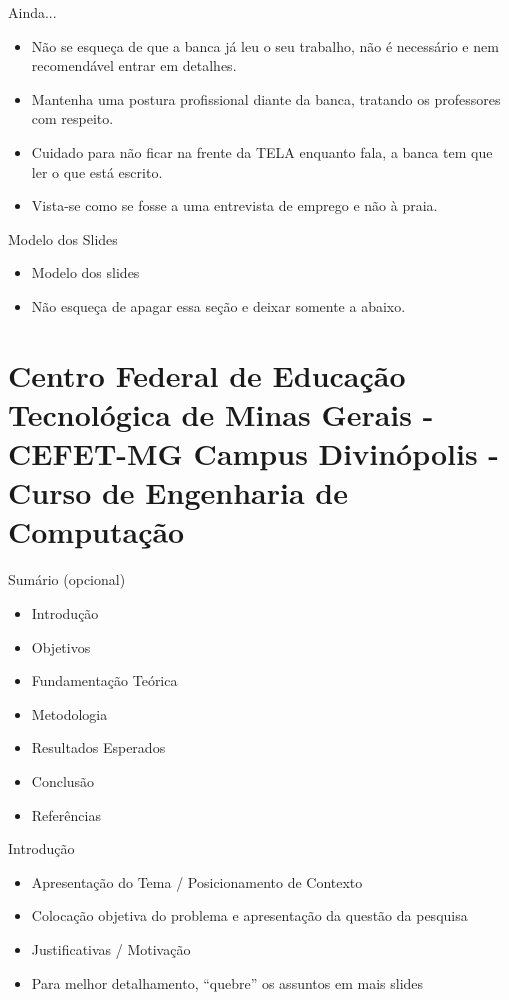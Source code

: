 \documentclass{beamer}
\begin{document}
\begin{frame}{Ainda...}
    \begin{itemize}
        \item Não se esqueça de que a banca já leu o seu trabalho, não é necessário e nem recomendável entrar em detalhes.
        \item Mantenha uma postura profissional diante da banca, tratando os professores com respeito.
        \item Cuidado para não ficar na frente da TELA enquanto fala, a banca tem que ler o que está escrito.
        \item Vista-se como se fosse a uma entrevista de emprego e não à praia.
    \end{itemize}
\end{frame}

\begin{frame}{Modelo dos Slides}
    \begin{itemize}
        \item Modelo dos slides
        \item Não esqueça de apagar essa seção e deixar somente a abaixo.
    \end{itemize}
\end{frame}

\section{Centro Federal de Educação Tecnológica de Minas Gerais - CEFET-MG Campus Divinópolis - Curso de Engenharia de Computação}

\begin{frame}{Sumário (opcional)}
    \small
    \begin{itemize}
        \item Introdução
        \item Objetivos
        \item Fundamentação Teórica
        \item Metodologia
        \item Resultados Esperados
        \item Conclusão
        \item Referências
    \end{itemize}
\end{frame}

\begin{frame}{Introdução}
    \small
    \begin{itemize}
        \item Apresentação do Tema / Posicionamento de Contexto
        \item Colocação objetiva do problema e apresentação da questão da pesquisa
        \item Justificativas / Motivação
        \item Para melhor detalhamento, “quebre” os assuntos em mais slides 
    \end{itemize}
\end{frame}
\end{document}

